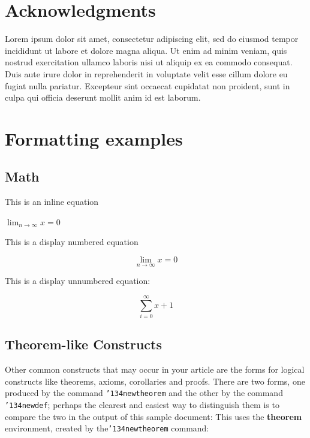 \documentclass{sig-alternate-05-2015}
\begin{document}
\section{Acknowledgments}
Lorem ipsum dolor sit amet, consectetur adipiscing elit, sed do eiusmod tempor incididunt ut labore et dolore magna aliqua. Ut enim ad minim veniam, quis nostrud exercitation ullamco laboris nisi ut aliquip ex ea commodo consequat. Duis aute irure dolor in reprehenderit in voluptate velit esse cillum dolore eu fugiat nulla pariatur. Excepteur sint occaecat cupidatat non proident, sunt in culpa qui officia deserunt mollit anim id est laborum.

\section{Formatting examples}

\subsection{Math}
This is an inline equation

\begin{math}
	\lim_{n\rightarrow \infty}x=0
\end{math}

This is a display numbered equation

\begin{equation}
	\lim_{n\rightarrow \infty}x=0
\end{equation}

This is a display unnumbered equation:

\begin{displaymath}
	\sum_{i=0}^{\infty} x + 1
\end{displaymath}

\subsection{Theorem-like Constructs}
Other common constructs that may occur in your article are the forms for logical constructs like theorems, axioms, corollaries and proofs.  There are two forms, one produced by the command \texttt{{\char'134}newtheorem} and the other by the command \texttt{{\char'134}newdef}; perhaps the clearest and easiest way to distinguish them is to compare the two in the output of this sample document: This uses the \textbf{theorem} environment, created by the\linebreak\texttt{{\char'134}newtheorem} command:
\end{document}

